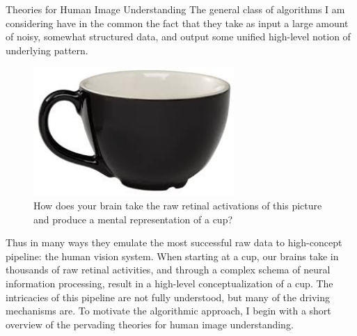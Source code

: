 \documentclass[12pt]{pom_thesis}
\begin{document}
\begin{chapter}{Theories for Human Image Understanding}
	The general class of algorithms I am considering have in the common the fact that they take as input a large amount of noisy, somewhat structured data, and output some unified high-level notion of underlying pattern. 
	\begin{figure}[h]
		\label{cup}
		\centering
		\includegraphics[width=3in]{cup}
		\caption{How does your brain take the raw retinal activations of this picture and produce a mental representation of a cup?}
	\end{figure}
	Thus in many ways they emulate the most successful raw data to high-concept pipeline: the human vision system. When starting at a cup, our brains take  in thousands of raw retinal activities, and through a complex schema of neural information processing, result in a high-level conceptualization of a cup. The intricacies of this pipeline are not fully understood, but many of the driving mechanisms are. To motivate the algorithmic approach, I begin with a short overview of the pervading theories for human image understanding. 


\end{chapter}
\end{document}
